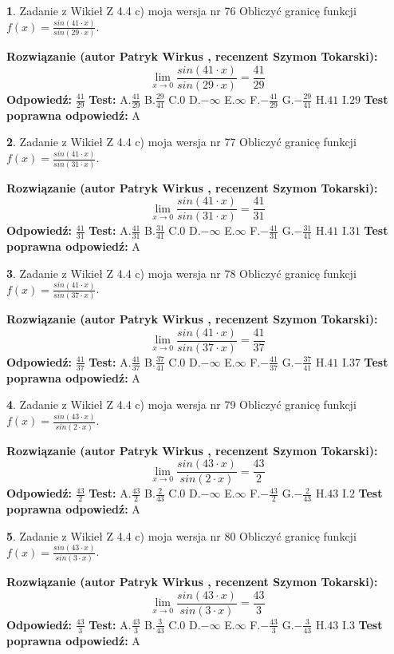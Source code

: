 \documentclass[12pt, a4paper]{article}
\theoremstyle{definition} %
\newtheorem{zad}{}
\newcommand{\zadStart}[1]{\begin{zad}#1\newline}
\newcommand{\zadStop}{\end{zad}}
\newcommand{\rozwStart}[2]{\noindent \textbf{Rozwiązanie (autor #1 , recenzent #2): }\newline}
\newcommand{\rozwStop}{\newline}
\newcommand{\odpStart}{\noindent \textbf{Odpowiedź:}\newline}
\newcommand{\odpStop}{\newline}
\newcommand{\testStart}{\noindent \textbf{Test:}\newline}
\newcommand{\testStop}{\newline}
\newcommand{\kluczStart}{\noindent \textbf{Test poprawna odpowiedź:}\newline}
\newcommand{\kluczStop}{\newline}
\begin{document}
\zadStart{Zadanie z Wikieł Z 4.4 c) moja wersja nr 76}
Obliczyć granicę funkcji $f(x)=\frac{sin(41\cdot x)}{sin(29\cdot x)}$.
\zadStop
\rozwStart{Patryk Wirkus}{Szymon Tokarski}
$$\lim\limits_{x\to 0}\frac{sin(41\cdot x)}{sin(29\cdot x)}=
\frac{41}{29}$$
\rozwStop
\odpStart
$\frac{41}{29}$
\odpStop
\testStart
A.$\frac{41}{29}$
B.$\frac{29}{41}$
C.$0$
D.$-\infty$
E.$\infty$
F.$-\frac{41}{29}$
G.$-\frac{29}{41}$
H.$41$
I.$29$
\testStop
\kluczStart
A
\kluczStop



\zadStart{Zadanie z Wikieł Z 4.4 c) moja wersja nr 77}
Obliczyć granicę funkcji $f(x)=\frac{sin(41\cdot x)}{sin(31\cdot x)}$.
\zadStop
\rozwStart{Patryk Wirkus}{Szymon Tokarski}
$$\lim\limits_{x\to 0}\frac{sin(41\cdot x)}{sin(31\cdot x)}=
\frac{41}{31}$$
\rozwStop
\odpStart
$\frac{41}{31}$
\odpStop
\testStart
A.$\frac{41}{31}$
B.$\frac{31}{41}$
C.$0$
D.$-\infty$
E.$\infty$
F.$-\frac{41}{31}$
G.$-\frac{31}{41}$
H.$41$
I.$31$
\testStop
\kluczStart
A
\kluczStop



\zadStart{Zadanie z Wikieł Z 4.4 c) moja wersja nr 78}
Obliczyć granicę funkcji $f(x)=\frac{sin(41\cdot x)}{sin(37\cdot x)}$.
\zadStop
\rozwStart{Patryk Wirkus}{Szymon Tokarski}
$$\lim\limits_{x\to 0}\frac{sin(41\cdot x)}{sin(37\cdot x)}=
\frac{41}{37}$$
\rozwStop
\odpStart
$\frac{41}{37}$
\odpStop
\testStart
A.$\frac{41}{37}$
B.$\frac{37}{41}$
C.$0$
D.$-\infty$
E.$\infty$
F.$-\frac{41}{37}$
G.$-\frac{37}{41}$
H.$41$
I.$37$
\testStop
\kluczStart
A
\kluczStop



\zadStart{Zadanie z Wikieł Z 4.4 c) moja wersja nr 79}
Obliczyć granicę funkcji $f(x)=\frac{sin(43\cdot x)}{sin(2\cdot x)}$.
\zadStop
\rozwStart{Patryk Wirkus}{Szymon Tokarski}
$$\lim\limits_{x\to 0}\frac{sin(43\cdot x)}{sin(2\cdot x)}=
\frac{43}{2}$$
\rozwStop
\odpStart
$\frac{43}{2}$
\odpStop
\testStart
A.$\frac{43}{2}$
B.$\frac{2}{43}$
C.$0$
D.$-\infty$
E.$\infty$
F.$-\frac{43}{2}$
G.$-\frac{2}{43}$
H.$43$
I.$2$
\testStop
\kluczStart
A
\kluczStop



\zadStart{Zadanie z Wikieł Z 4.4 c) moja wersja nr 80}
Obliczyć granicę funkcji $f(x)=\frac{sin(43\cdot x)}{sin(3\cdot x)}$.
\zadStop
\rozwStart{Patryk Wirkus}{Szymon Tokarski}
$$\lim\limits_{x\to 0}\frac{sin(43\cdot x)}{sin(3\cdot x)}=
\frac{43}{3}$$
\rozwStop
\odpStart
$\frac{43}{3}$
\odpStop
\testStart
A.$\frac{43}{3}$
B.$\frac{3}{43}$
C.$0$
D.$-\infty$
E.$\infty$
F.$-\frac{43}{3}$
G.$-\frac{3}{43}$
H.$43$
I.$3$
\testStop
\kluczStart
A
\kluczStop
\end{document}
